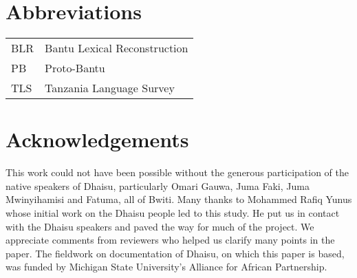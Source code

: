 \documentclass[output=paper,colorlinks,citecolor=brown]{langscibook}
\begin{document}
\section*{Abbreviations}
\begin{tabular}{@{}ll@{}}
  BLR    &   Bantu Lexical Reconstruction\\
  PB     &   Proto-Bantu\\
  TLS    &   Tanzania Language Survey\\
\end{tabular}

\section*{Acknowledgements}
This work could not have been possible without the generous participation of the native speakers of Dhaisu, particularly Omari Gauwa, Juma Faki, Juma Mwinyihamisi and Fatuma, all of Bwiti. Many thanks to Mohammed Rafiq Yunus whose initial work on the Dhaisu people led to this study. He put us in contact with the Dhaisu speakers and paved the way for much of the project. We appreciate comments from reviewers who helped us clarify many points in the paper. The fieldwork on documentation of Dhaisu, on which this paper is based, was funded by Michigan State University's Alliance for African Partnership.
 
{\sloppy\printbibliography[heading=subbibliography,notkeyword=this]}
\end{document}

